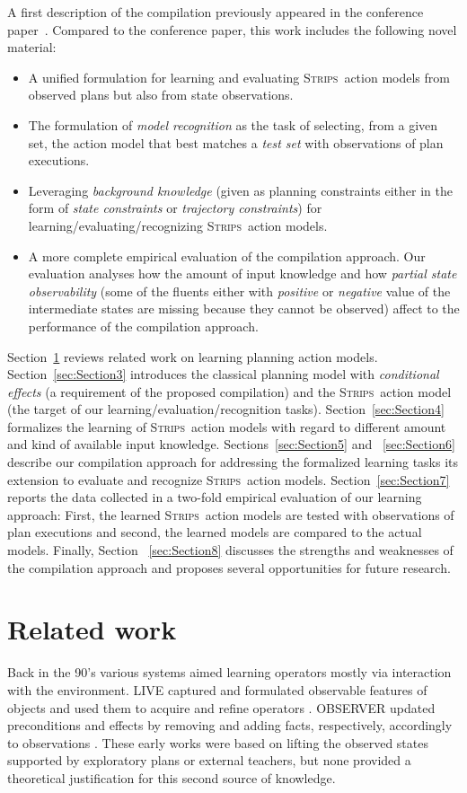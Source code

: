 \documentclass[3p,times]{elsarticle}
\newcommand{\strips}{\textsc{Strips}}     %
\begin{document}
A first description of the compilation previously appeared in the conference paper~\cite{aineto2018learning}. Compared to the conference paper, this work includes the following novel material:
\begin{itemize}
\item A unified formulation for learning and evaluating \strips\ action models from observed plans but also from state observations.
\item The formulation of {\em model recognition} as the task of selecting, from a given set, the action model that best matches a {\em test set} with observations of plan executions.
\item Leveraging {\em background knowledge} (given as planning constraints either in the form of {\em state constraints} or {\em trajectory constraints}) for learning/evaluating/recognizing \strips\ action models.
\item A more complete empirical evaluation of the compilation approach. Our evaluation analyses how the amount of input knowledge and how {\em partial state observability} (some of the fluents either with {\em positive} or {\em negative} value of the intermediate states are missing because they cannot be observed) affect to the performance of the compilation approach.
\end{itemize}  

Section~\ref{sec:Section2} reviews related work on learning planning action models. Section~\ref{sec:Section3} introduces the classical planning model with {\em conditional effects} (a requirement of the proposed compilation) and the \strips\ action model (the target of our learning/evaluation/recognition tasks). Section~\ref{sec:Section4} formalizes the learning of \strips\ action models with regard to different amount and kind of available input knowledge. Sections~\ref{sec:Section5} and ~\ref{sec:Section6} describe our compilation approach for addressing the formalized learning tasks its extension to evaluate and recognize \strips\ action models. Section~\ref{sec:Section7} reports the data collected in a two-fold empirical evaluation of our learning approach: First, the learned \strips\ action models are tested with observations of plan executions and second, the learned models are compared to the actual models. Finally, Section ~\ref{sec:Section8} discusses the strengths and weaknesses of the compilation approach and proposes several opportunities for future research.



\section{Related work}
\label{sec:Section2}
Back in the 90's various systems aimed learning operators mostly via interaction with the environment. {\sc LIVE} captured and formulated observable features of objects and used them to acquire and refine operators \cite{ShenS89}. {\sc OBSERVER} updated preconditions and effects by removing and adding facts, respectively, accordingly to observations \cite{Wang95learningby}. These early works were based on lifting the observed states supported by exploratory plans or external teachers, but none provided a theoretical justification for this second source of knowledge.
\end{document}
